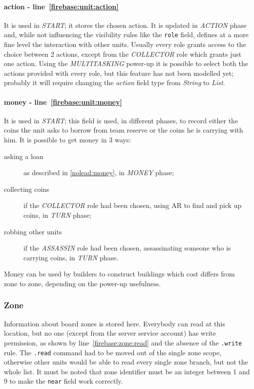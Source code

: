 				\paragraph{action - line~\ref{firebase:unit:action}}
				It is used in \emph{START}; it stores the chosen action. It is updated in \emph{ACTION} phase and, while not influencing the visibility rules like the \lstinline|role| field, defines at a more fine level the interaction with other units. Usually every role grants access to the choice between 2 actions, except from the \emph{COLLECTOR} role which grants just one action. Using the \emph{MULTITASKING} power-up it is possible to select both the actions provided with every role, but this feature has not been modelled yet; probably it will require changing the \emph{action} field type from \emph{String} to \emph{List}.
				
				\paragraph{money - line~\ref{firebase:unit:money}}
				It is used in \emph{START}; this field is used, in different phases, to record either the coins the unit asks to borrow from team reserve or the coins he is carrying with him. It is possible to get money in 3 ways:
				\begin{description}
					\item[asking a loan] as described in \autoref{nolead:money}, in \emph{MONEY} phase;
					\item[collecting coins] if the \emph{COLLECTOR} role had been chosen, using AR to find and pick up coins, in \emph{TURN} phase;
					\item[robbing other units] if the \emph{ASSASSIN} role had been chosen, assassinating someone who is carrying coins, in \emph{TURN} phase.
				\end{description}
			
				Money can be used by builders to construct buildings which cost differs from zone to zone, depending on the power-up usefulness.
			
			\subsubsection{Zone}
			
				
								
				Information about board zones is stored here.
				Everybody can read at this location, but no one (except from the server service account) has write permission, as shown by line~\ref{firebase:zone:read} and the absence of the \lstinline|.write| rule.
				The \lstinline|.read| command had to be moved out of the single zone scope, otherwise other units would be able to read every single zone branch, but not the whole list.
				It must be noted that zone identifier must be an integer between 1 and 9 to make the \lstinline|near| field work correctly. \\
				
